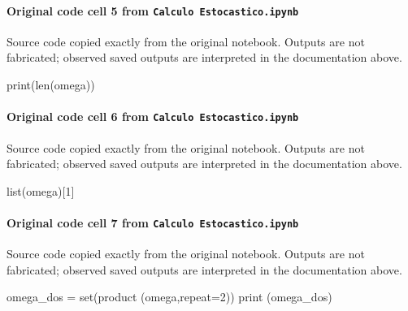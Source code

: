 \documentclass[
  11pt,
]{article}
\newenvironment{Shaded}{}{}
\newcommand{\BuiltInTok}[1]{\textcolor[rgb]{0.00,0.50,0.00}{#1}}
\newcommand{\DecValTok}[1]{\textcolor[rgb]{0.25,0.63,0.44}{#1}}
\newcommand{\NormalTok}[1]{#1}
\newcommand{\OperatorTok}[1]{\textcolor[rgb]{0.40,0.40,0.40}{#1}}
\begin{document}
\paragraph{\texorpdfstring{Original code cell 5 from \texttt{Calculo\ Estocastico.ipynb}}{Original code cell 5 from Calculo Estocastico.ipynb}}\label{original-code-cell-5-from-calculo-estocasticoipynb}

Source code copied exactly from the original notebook. Outputs are not fabricated; observed saved outputs are interpreted in the documentation above.

\begin{Shaded}
\begin{Highlighting}[]
\BuiltInTok{print}\NormalTok{(}\BuiltInTok{len}\NormalTok{(omega))}
\end{Highlighting}
\end{Shaded}

\paragraph{\texorpdfstring{Original code cell 6 from \texttt{Calculo\ Estocastico.ipynb}}{Original code cell 6 from Calculo Estocastico.ipynb}}\label{original-code-cell-6-from-calculo-estocasticoipynb}

Source code copied exactly from the original notebook. Outputs are not fabricated; observed saved outputs are interpreted in the documentation above.

\begin{Shaded}
\begin{Highlighting}[]
\BuiltInTok{list}\NormalTok{(omega)[}\DecValTok{1}\NormalTok{]}
\end{Highlighting}
\end{Shaded}

\paragraph{\texorpdfstring{Original code cell 7 from \texttt{Calculo\ Estocastico.ipynb}}{Original code cell 7 from Calculo Estocastico.ipynb}}\label{original-code-cell-7-from-calculo-estocasticoipynb}

Source code copied exactly from the original notebook. Outputs are not fabricated; observed saved outputs are interpreted in the documentation above.

\begin{Shaded}
\begin{Highlighting}[]
\NormalTok{omega\_dos }\OperatorTok{=} \BuiltInTok{set}\NormalTok{(product (omega,repeat}\OperatorTok{=}\DecValTok{2}\NormalTok{))}
\BuiltInTok{print}\NormalTok{ (omega\_dos)}
\end{Highlighting}
\end{Shaded}
\end{document}
